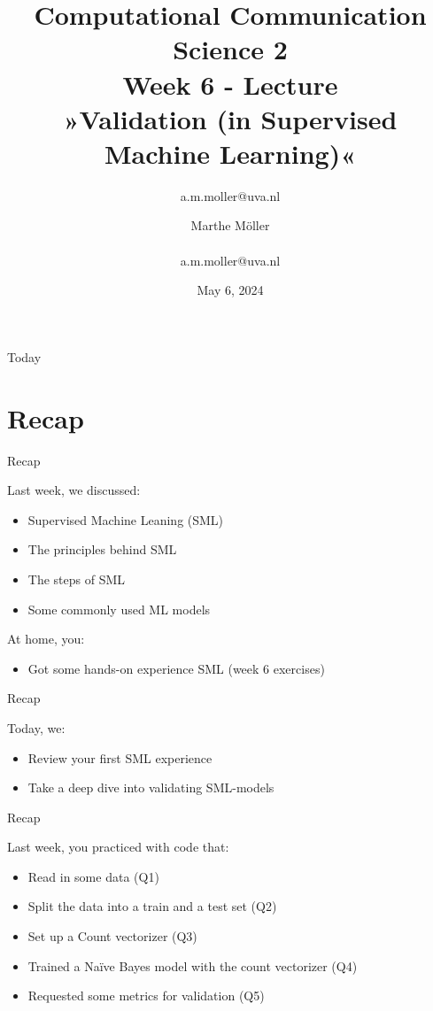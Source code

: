 \documentclass[compress]{beamer}
\title[Computational Communication Science 2]{\textbf{Computational Communication Science 2} \\Week 6 - Lecture\\ »Validation (in Supervised Machine Learning)«}
\author[Marthe Möller]{a.m.moller@uva.nl}\author[A. Marthe Möller]{Marthe Möller \\ ~ \\ \footnotesize{a.m.moller@uva.nl} \\}
\date{May 6, 2024}
\institute[Digital Society Minor, University of Amsterdam]{Digital Society Minor, University of Amsterdam}
\begin{document}
	
	\begin{frame}{}
		\titlepage
	\end{frame}
	
	\begin{frame}{Today}
		\begin{tiny}
			\tableofcontents
		\end{tiny}
	\end{frame}


\section{Recap}

\begin{frame}[fragile]{Recap} 
	
\begin{alertblock}{Last week, we discussed:}
\begin{itemize}
	\item Supervised Machine Leaning (SML)
	\item The principles behind SML
	\item The steps of SML
	\item Some commonly used ML models
\end{itemize}
\end{alertblock}
	
\begin{alertblock}{At home, you:}
\begin{itemize}
	\item Got some hands-on experience SML (week 6 exercises)
\end{itemize}
\end{alertblock}	
\end{frame}


\begin{frame}[fragile]{Recap} 
\begin{alertblock}{Today, we:}
\begin{itemize}
	\item Review your first SML experience
	\item  Take a deep dive into validating SML-models
\end{itemize}
\end{alertblock}
	
\end{frame}


\begin{frame}[fragile]{Recap} 
	
\begin{alertblock}{Last week, you practiced with code that:}
\begin{itemize}
	\item Read in some data (Q1)
 	\item Split the data into a train and a test set (Q2)
	\item Set up a Count vectorizer (Q3)
	\item Trained a Naïve Bayes model with the count vectorizer (Q4)
	\item Requested some metrics for validation (Q5)
\end{itemize}
\end{alertblock}

\end{frame}
\end{document}
